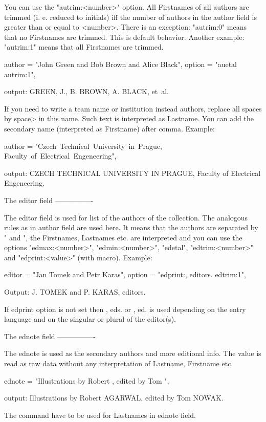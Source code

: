 You can use the "autrim:<number>" option. All Firstnames of all authors
are trimmed (i. e. reduced to initials) iff the number of authors in the 
author field is greater than or equal to <number>. There is an exception:
"autrim:0" means that no Firstnames are trimmed. This is default behavior.
Another example: "autrim:1" means that all Firstnames are trimmed.

   author = "John Green and Bob Brown and Alice Black",
   option = "auetal autrim:1",

output:    GREEN, J., B. BROWN, A. BLACK, et~al.

If you need to write a team name or institution instead authors, replace all
spaces by \<space> in this name. Such text is interpreted as Lastname. You
can add the secondary name (interpreted as Firstname) after comma. Example:

   author = "Czech\ Technical\ University\ in\ Prague, Faculty\ of\ Electrical\ Engeneering",

output:  CZECH TECHNICAL UNIVERSITY IN PRAGUE, Faculty of Electrical Engeneering.


The editor field
----------------

The editor field is used for list of the authors of the collection. The
analogous rules as in author field are used here. It means that the
authors are separated by " and ", the Firstnames, Lastnames etc. are
interpreted and you can use the options "edmax:<number>", "edmin:<number>", 
"edetal", "edtrim:<number>" and "edprint:<value>" (with \ED macro).
Example:

    editor = "Jan Tomek and Petr Karas",
    option = "edprint:{\ED, editors.} edtrim:1",

Output:   J. TOMEK and P. KARAS, editors.

If edprint option is not set then {\ED, eds.} or {\ED, ed.} is used
depending on the entry language and on the singular or plural of 
the editor(s).


The ednote field
----------------

The ednote is used as the secondary authors and more editional info. The
value is read as raw data without any interpretation of Lastname, Firstname
etc.

    ednote = "Illustrations by Robert , edited by Tom ",

output:   Illustrations by Robert AGARWAL, edited by Tom NOWAK.

The \upper command have to be used for Lastnames in ednote field.


